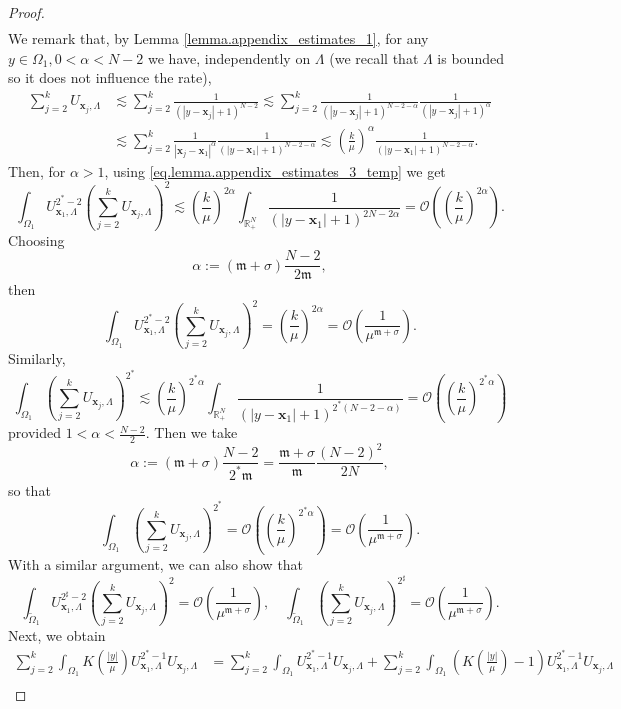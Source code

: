 \documentclass[11pt,a4paper]{amsart}
\begin{document}
\begin{proof}
$$\begin{aligned}
\end{aligned}$$
We remark that, by Lemma \ref{lemma.appendix_estimates_1},
for any $y\in\Omega_1,0<\alpha<N-2$ we have, independently on $\Lambda$ (we recall that $\Lambda$ is bounded so it does not influence the rate),
$$\begin{aligned}\sum_{j=2}^kU_{\mathbf{x}_j,\Lambda}&\lesssim \sum_{j=2}^k\frac{1}{(|y-\mathbf{x}_j|+1)^{N-2}}\lesssim \sum_{j=2}^k\frac{1}{(|y-\mathbf{x}_j|+1)^{N-2-\alpha}}\frac{1}{(|y-\mathbf{x}_j|+1)^{\alpha}}\\
&\lesssim \sum_{j=2}^k\frac{1}{|\mathbf{x}_j-\mathbf{x}_1|^{\alpha}}\frac{1}{(|y-\mathbf{x}_1|+1)^{N-2-\alpha}}\lesssim \left(\frac{k}{\mu}\right)^{\alpha}\frac{1}{(|y-\mathbf{x}_1|+1)^{N-2-\alpha}}.\end{aligned}$$
Then, for $\alpha>1$, using \eqref{eq.lemma.appendix_estimates_3_temp} we get
$$\int_{\Omega_1}U_{\mathbf{x}_1,\Lambda}^{2^*-2}\left(\sum_{j=2}^kU_{\mathbf{x}_j,\Lambda}\right)^2\lesssim \left(\frac{k}{\mu}\right)^{2\alpha}\int_{\mathbb R^N_+}\frac{1}{(|y-\mathbf{x}_1|+1)^{2N-2\alpha}}=\mathcal O\left(\left(\frac{k}{\mu}\right)^{2\alpha}\right).$$ 
Choosing $$\alpha:=(\mathfrak m+\sigma)\frac{N-2}{2\mathfrak m},$$
then
$$\int_{\Omega_1}U_{\mathbf{x}_1,\Lambda}^{2^*-2}\left(\sum_{j=2}^kU_{\mathbf{x}_j,\Lambda}\right)^2=\left(\frac{k}{\mu}\right)^{2\alpha}=\mathcal O\left(\frac{1}{\mu^{\mathfrak m+\sigma}}\right).$$
Similarly,
$$\int_{\Omega_1}\left(\sum_{j=2}^kU_{\mathbf{x}_j,\Lambda}\right)^{2^*}\lesssim \left(\frac{k}{\mu}\right)^{2^*\alpha}\int_{\mathbb R^N_+}\frac{1}{(|y-\mathbf{x}_1|+1)^{2^*(N-2-\alpha)}}=\mathcal O\left(\left(\frac{k}{\mu}\right)^{2^*\alpha}\right)$$
provided $1<\alpha<\frac{N-2}{2}$. Then we take
 $$\alpha:=(\mathfrak m+\sigma)\frac{N-2}{2^*\mathfrak m}=\frac{\mathfrak m+\sigma}{\mathfrak m}\frac{(N-2)^2}{2N},$$ so that
$$\int_{\Omega_1}\left(\sum_{j=2}^kU_{\mathbf{x}_j,\Lambda}\right)^{2^*}=\mathcal O\left(\left(\frac{k}{\mu}\right)^{2^*\alpha}\right)=\mathcal O\left(\frac{1}{\mu^{\mathfrak m+\sigma}}\right).$$
With a similar argument, we can also show that
$$\int_{\widetilde\Omega_1}U_{\mathbf{x}_1,\Lambda}^{2^\sharp-2}\left(\sum_{j=2}^kU_{\mathbf{x}_j,\Lambda}\right)^2=\mathcal O\left(\frac{1}{\mu^{\mathfrak m+\sigma}}\right),\quad \int_{\widetilde\Omega_1}\left(\sum_{j=2}^kU_{\mathbf{x}_j,\Lambda}\right)^{2^\sharp}=\mathcal O\left(\frac{1}{\mu^{\mathfrak m+\sigma}}\right).$$
Next, we obtain
$$\begin{aligned}
\sum_{j=2}^k\int_{\Omega_1}K\left(\frac{|y|}{\mu}\right)U_{\mathbf{x}_1,\Lambda}^{2^*-1}U_{\mathbf{x}_j,\Lambda}&=\sum_{j=2}^k\int_{\Omega_1}U_{\mathbf{x}_1,\Lambda}^{2^*-1}U_{\mathbf{x}_j,\Lambda}+\sum_{j=2}^k\int_{\Omega_1}\left(K\left(\frac{|y|}{\mu}\right)-1\right)U_{\mathbf{x}_1,\Lambda}^{2^*-1}U_{\mathbf{x}_j,\Lambda}&\\

\end{aligned}$$
\end{proof}
\end{document}
